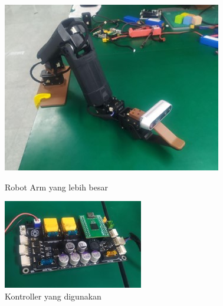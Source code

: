 \begin{figure}[h]
    \centering
    \begin{minipage}{0.48\columnwidth}
        \centering
        \includegraphics[width=\linewidth]{gambar/robot arm yg digunakan.jpg}
        \caption{Robot Arm yang lebih besar}
        \label{fig:robot_arm_custom}
    \end{minipage}
    \hfill
    \begin{minipage}{0.36\columnwidth}
        \centering
        \includegraphics[width=\linewidth]{gambar/kontroller ichiro.jpg}
        \caption{Kontroller yang digunakan}
        \label{fig:kontroller_ichiro}
    \end{minipage}
\end{figure}

